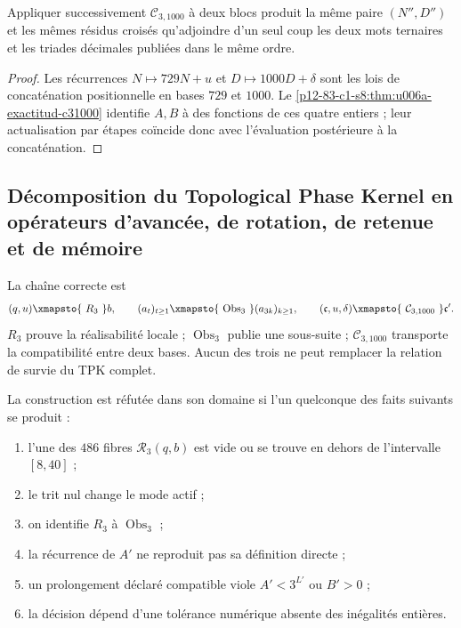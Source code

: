 {\begin{proposition}
\label{p12-83-c1-s8:prop:u006a-concatenacion-c31000}
Appliquer successivement \(\mathcal C_{3,1000}\) à deux blocs produit la
même paire \((N'',D'')\) et les mêmes résidus croisés qu’adjoindre d’un seul
coup les deux mots ternaires et les triades décimales publiées dans le
même ordre.
\end{proposition}

\begin{proof}
Les récurrences \(N\mapsto729N+u\) et
\(D\mapsto1000D+\delta\) sont les lois de concaténation positionnelle en
bases \(729\) et \(1000\). Le
\cref{p12-83-c1-s8:thm:u006a-exactitud-c31000} identifie \(A,B\) à des fonctions de ces
quatre entiers ; leur actualisation par étapes coïncide donc avec
l’évaluation postérieure à la concaténation.
\end{proof}

\subsection{Décomposition du Topological Phase Kernel en opérateurs d’avancée, de rotation, de retenue et de mémoire}

La chaîne correcte est
\[
 (q,u)\xmapsto{\ R_3\ }b,
 \qquad
 (a_t)_{t\geq1}
 \xmapsto{\ \operatorname{Obs}_3\ }
 (a_{3k})_{k\geq1},
 \qquad
 (\mathfrak c,u,\delta)
 \xmapsto{\ \mathcal C_{3,1000}\ }
 \mathfrak c'.
\]
\(R_3\) prouve la réalisabilité locale ; \(\operatorname{Obs}_3\) publie une
sous-suite ; \(\mathcal C_{3,1000}\) transporte la compatibilité entre deux
bases. Aucun des trois ne peut remplacer la relation de survie
du TPK complet.

\begin{criterion}
\label{p12-83-c1-s8:crit:u006a-refutacion}
La construction est réfutée dans son domaine si l’un quelconque des
faits suivants se produit :
\begin{enumerate}
 \item l’une des \(486\) fibres \(\mathcal R_3(q,b)\) est vide ou se trouve
       en dehors de l’intervalle \([8,40]\) ;
 \item le trit nul change le mode actif ;
 \item on identifie \(R_3\) à \(\operatorname{Obs}_3\) ;
 \item la récurrence de \(A'\) ne reproduit pas sa définition directe ;
 \item un prolongement déclaré compatible viole \(A'<3^{L'}\) ou
       \(B'>0\) ;
 \item la décision dépend d’une tolérance numérique absente des
       inégalités entières.
\end{enumerate}
\end{criterion}


}
